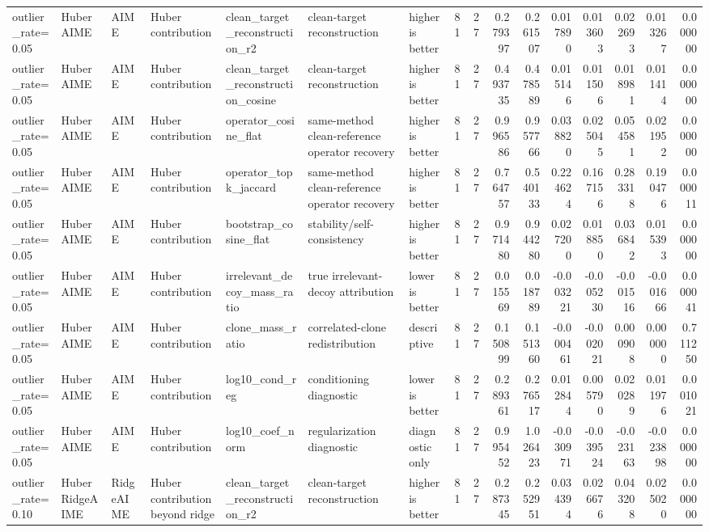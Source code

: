 \begin{table}[t]
\begin{tabular}{lllllllrrrrrrrrr}
outlier_rate=0.05 & HuberAIME & AIME & Huber contribution & clean_target_reconstruction_r2 & clean-target reconstruction & higher is better & 81 & 27 & 0.279397 & 0.261507 & 0.017890 & 0.013603 & 0.022693 & 0.013267 & 0.000000 \\
outlier_rate=0.05 & HuberAIME & AIME & Huber contribution & clean_target_reconstruction_cosine & clean-target reconstruction & higher is better & 81 & 27 & 0.493735 & 0.478589 & 0.015146 & 0.011506 & 0.018981 & 0.011414 & 0.000000 \\
outlier_rate=0.05 & HuberAIME & AIME & Huber contribution & operator_cosine_flat & same-method clean-reference operator recovery & higher is better & 81 & 27 & 0.996586 & 0.957766 & 0.038820 & 0.025045 & 0.054581 & 0.021952 & 0.000000 \\
outlier_rate=0.05 & HuberAIME & AIME & Huber contribution & operator_topk_jaccard & same-method clean-reference operator recovery & higher is better & 81 & 27 & 0.764757 & 0.540133 & 0.224624 & 0.167156 & 0.283318 & 0.190476 & 0.000011 \\
outlier_rate=0.05 & HuberAIME & AIME & Huber contribution & bootstrap_cosine_flat & stability/self-consistency & higher is better & 81 & 27 & 0.971480 & 0.944280 & 0.027200 & 0.018850 & 0.036842 & 0.015393 & 0.000000 \\
outlier_rate=0.05 & HuberAIME & AIME & Huber contribution & irrelevant_decoy_mass_ratio & true irrelevant-decoy attribution & lower is better & 81 & 27 & 0.015569 & 0.018789 & -0.003221 & -0.005230 & -0.001516 & -0.001666 & 0.000041 \\
outlier_rate=0.05 & HuberAIME & AIME & Huber contribution & clone_mass_ratio & correlated-clone redistribution & descriptive & 81 & 27 & 0.150899 & 0.151360 & -0.000461 & -0.002021 & 0.000908 & 0.000000 & 0.711250 \\
outlier_rate=0.05 & HuberAIME & AIME & Huber contribution & log10_cond_reg & conditioning diagnostic & lower is better & 81 & 27 & 0.289361 & 0.276517 & 0.012844 & 0.005790 & 0.020289 & 0.011976 & 0.001021 \\
outlier_rate=0.05 & HuberAIME & AIME & Huber contribution & log10_coef_norm & regularization diagnostic & diagnostic only & 81 & 27 & 0.995452 & 1.026423 & -0.030971 & -0.039524 & -0.023163 & -0.023898 & 0.000000 \\
outlier_rate=0.10 & HuberRidgeAIME & RidgeAIME & Huber contribution beyond ridge & clean_target_reconstruction_r2 & clean-target reconstruction & higher is better & 81 & 27 & 0.287345 & 0.252951 & 0.034394 & 0.026676 & 0.043208 & 0.025020 & 0.000000 \\

\end{tabular}
\end{table}
